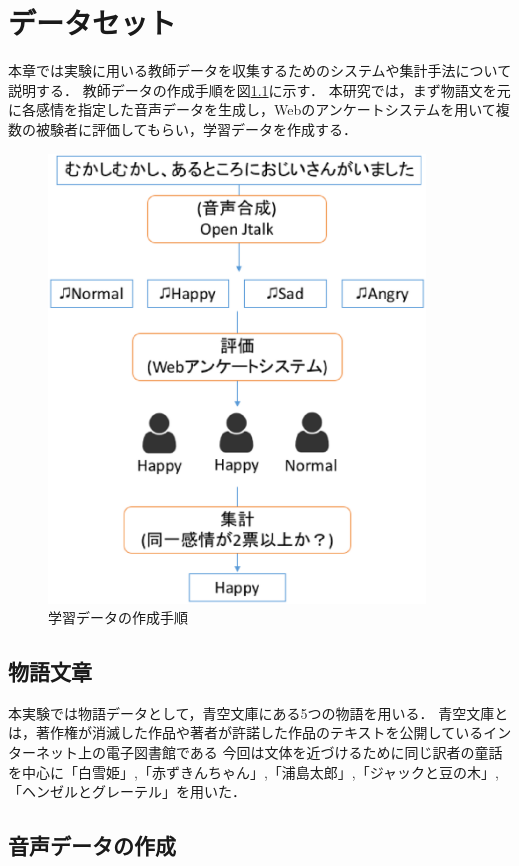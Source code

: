 \chapter{データセット}
本章では実験に用いる教師データを収集するためのシステムや集計手法について説明する．
教師データの作成手順を図\ref{fig:enquete}に示す．
本研究では，まず物語文を元に各感情を指定した音声データを生成し，Webのアンケートシステムを用いて複数の被験者に評価してもらい，学習データを作成する．

\begin{figure}[hb]
  \begin{center}
    \includegraphics[clip,width=10.0cm]{fig/enquete.eps}
    \caption{学習データの作成手順}
    \label{fig:enquete}
  \end{center}
\end{figure}

\section{物語文章}
本実験では物語データとして，青空文庫\cite{aozora}にある5つの物語を用いる．
青空文庫とは，著作権が消滅した作品や著者が許諾した作品のテキストを公開しているインターネット上の電子図書館である
今回は文体を近づけるために同じ訳者の童話を中心に「白雪姫」,「赤ずきんちゃん」,「浦島太郎」,「ジャックと豆の木」,「ヘンゼルとグレーテル」を用いた．

\section{音声データの作成}
